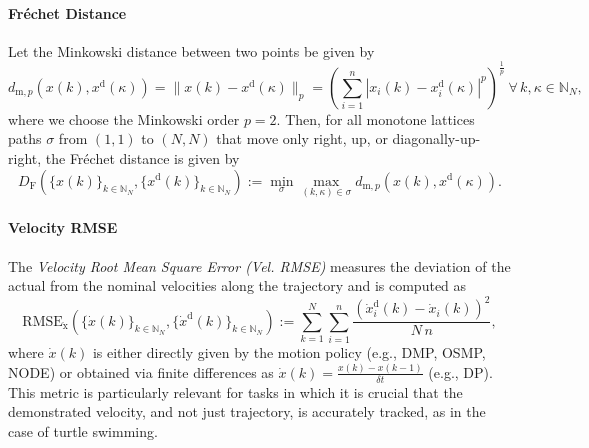 \paragraph{Fréchet Distance}
Let the Minkowski distance between two points be given by
\begin{equation}
    d_{\mathrm{m},p}(x(k), x^\mathrm{d}(\kappa)) = \lVert x(k) - x^\mathrm{d}(\kappa) \rVert_p = \left ( \sum_{i=1}^n \left | x_i(k) - x_i^\mathrm{d}(\kappa) \right |^p \right )^{\frac{1}{p}} \: \forall \, k, \kappa \in\mathbb{N}_N,
\end{equation}
where we choose the Minkowski order $p = 2$. Then, for all monotone lattices paths $\sigma$ from $(1,1)$ to $(N, N)$ that move only right, up, or diagonally-up-right, the Fréchet distance is given by~\citep{eiter1994computing}
\begin{equation}
    D_\mathrm{F}\left (\{x(k)\}_{k\in\mathbb{N}_N},\{x^{\mathrm d}(k)\}_{k\in\mathbb{N}_N} \right ) := \min_{\sigma} \max_{(k,\kappa) \in \sigma} d_{\mathrm{m},p}(x(k), x^\mathrm{d}(\kappa)).
\end{equation}

\paragraph{Velocity RMSE}
The \emph{Velocity Root Mean Square Error (Vel. \gls{RMSE})} measures the deviation of the actual from the nominal velocities along the trajectory and is computed as
\begin{equation}
    \mathrm{RMSE}_\mathrm{\dot{x}}\left (\{\dot{x}(k)\}_{k\in\mathbb{N}_N},\{\dot{x}^{\mathrm d}(k)\}_{k\in\mathbb{N}_N} \right ) := \sum_{k=1}^{N}  \sum_{i=1}^{n} \frac{\left ( \dot{x}_i^\mathrm{d}(k) - \dot{x}_i(k) \right )^2}{N \, n},
\end{equation}
where $\dot{x}(k)$ is either directly given by the motion policy (e.g., \gls{DMP}, \gls{OSMP}, \gls{NODE}) or obtained via finite differences as $\dot{x}(k) = \frac{x(k) - x(k-1)}{\delta t}$ (e.g., \gls{DP}).
This metric is particularly relevant for tasks in which it is crucial that the demonstrated velocity, and not just trajectory, is accurately tracked, as in the case of turtle swimming.

